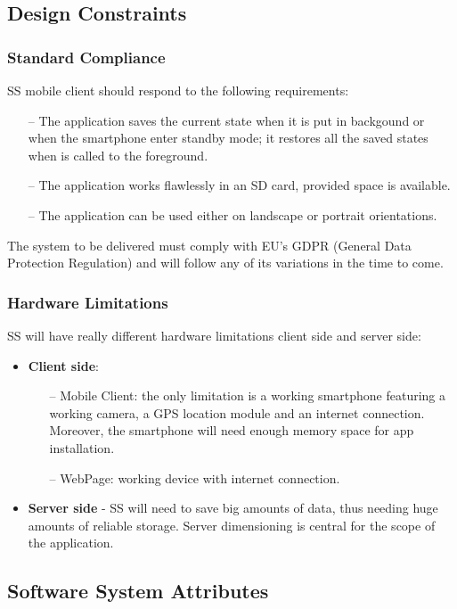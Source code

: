 \subsection{Design Constraints}
	\subsubsection{Standard Compliance}
	SS mobile client should respond to the following requirements:
	\begin{itemize}
		\item[--] The application saves the current state when it is put in backgound or when the smartphone enter standby mode; it restores all the saved states when is called to the foreground.
		\item[--] The application works flawlessly in an SD card, provided space is available.
		\item[--] The application can be used either on landscape or portrait orientations.
	\end{itemize}
	The system to be delivered must comply with EU's GDPR (General Data Protection Regulation) and will follow any of its variations in the time to come.
	\subsubsection{Hardware Limitations}
	SS will have really different hardware limitations client side and server side:
	\begin{itemize}
		\item \textbf{Client side}:
		\begin{itemize}
		 \item[--] Mobile Client: the only limitation is a working smartphone featuring a working camera, a GPS location module and an internet connection. Moreover, the smartphone will need enough memory space for app installation.
		 \item[--] WebPage: working device with internet connection.
		 \end{itemize}
		\item \textbf{Server side} - SS will need to save big amounts of data, thus needing huge amounts of reliable storage. Server dimensioning is central for the scope of the application.
	\end{itemize}
	 
\subsection{Software System Attributes}
